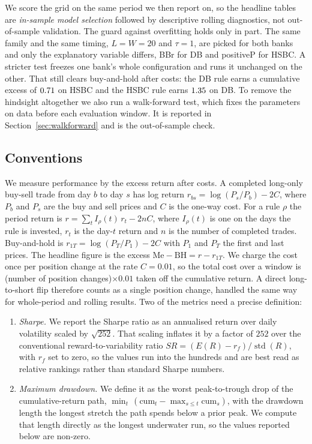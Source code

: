 \documentclass[12pt,a4paper]{article}
\newcommand{\Me}{\mathrm{Me}}
\newcommand{\BH}{\mathrm{BH}}
\begin{document}
We score the grid on the same period we then report on, so the headline tables
are \emph{in-sample model selection} followed by descriptive rolling
diagnostics, not out-of-sample validation. The guard against overfitting holds
only in part. The same family and the same timing, $L=W=20$ and $\tau=1$, are
picked for both banks and only the explanatory variable differs, BBr for DB and
positiveP for HSBC. A stricter test freezes one bank's whole configuration and
runs it unchanged on the other. That still clears buy-and-hold after costs: the
DB rule earns a cumulative excess of $0.71$ on HSBC and the HSBC rule
earns $1.35$ on DB. To remove the hindsight altogether we also run a walk-forward
test, which fixes the parameters on data before each evaluation window. It is
reported in Section~\ref{sec:walkforward} and is the out-of-sample check.

\subsection{Conventions}
We measure performance by the excess return after costs. A completed
long-only buy-sell trade from day $b$ to day $s$ has
log return $r_{bs}=\log(P_s/P_b)-2C$, where $P_b$ and $P_s$ are the buy and sell
prices and $C$ is the one-way cost. For a rule $\rho$ the period return is
$r=\sum_{t} I_\rho(t)\,r_t - 2nC$, where $I_\rho(t)$ is one on the days the rule
is invested, $r_t$ is the day-$t$ return and $n$ is the number of completed
trades. Buy-and-hold is $r_{1T}=\log(P_T/P_1)-2C$ with $P_1$ and $P_T$ the first
and last prices. The headline figure is the excess
$\Me-\BH=r-r_{1T}$. We charge the cost once per position change at the rate
$C=0.01$, so the total cost over a window is (number of position
changes)$\times 0.01$ taken off the cumulative return. A direct long-to-short
flip therefore counts as a single position change, handled the same way for
whole-period and rolling results. Two of the metrics need a precise definition:
\begin{enumerate}[label=\roman*., itemsep=1pt]
  \item \emph{Sharpe.} We report the Sharpe ratio as an annualised return over
  daily volatility scaled by $\sqrt{252}$. That scaling inflates it by a factor
  of $252$ over the conventional reward-to-variability ratio
  $SR=(E(R)-r_f)/\operatorname{std}(R)$, with $r_f$ set to zero, so the values
  run into the hundreds and are best read as relative rankings rather than
  standard Sharpe numbers.
  \item \emph{Maximum drawdown.} We define it as the worst peak-to-trough drop
  of the cumulative-return path, $\min_t\,(\mathrm{cum}_t-\max_{s\le t}\mathrm{cum}_s)$,
  with the drawdown length the longest stretch the path spends below a prior
  peak. We compute that length directly as the longest underwater run, so the
  values reported below are non-zero.
\end{enumerate}
\end{document}
